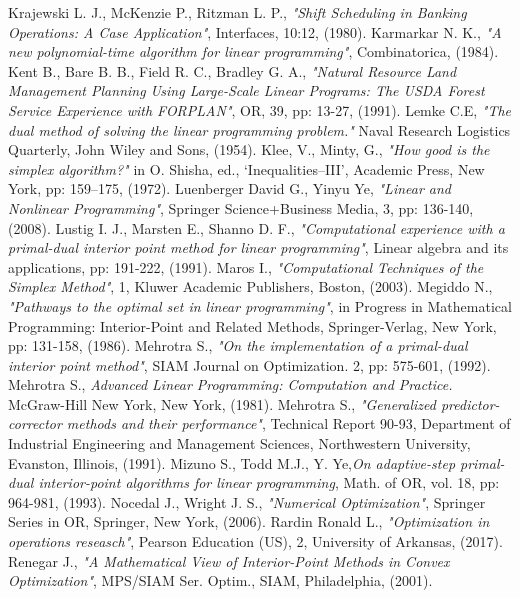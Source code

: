 \documentclass[a4paper,10 pt,titlepage,twoside]{book}
\theoremstyle{plain}
\theoremstyle{definition}
\theoremstyle{remark}
\begin{document}
{{\begin{thebibliography}{9}
		Krajewski L. J., McKenzie P., Ritzman L. P.,\textit{ "Shift Scheduling in Banking Operations: A Case Application"}, Interfaces, 10:12, (1980).
		 Karmarkar N. K.,\emph{ "A new polynomial-time algorithm for linear programming"}, Combinatorica, (1984).
		 Kent B., Bare B. B., Field R. C., Bradley G. A., \textit{"Natural Resource Land Management Planning Using Large-Scale Linear Programs: The USDA Forest Service Experience with FORPLAN"}, OR, 39, pp: 13-27, (1991).
		 Lemke C.E,\textit{ "The dual method of solving the linear programming problem."} Naval Research Logistics Quarterly, John Wiley and Sons, (1954).
		 Klee, V., Minty, G.,\emph{ "How good is the simplex algorithm?"} in O. Shisha, ed., ‘Inequalities–III’, Academic Press, New York, pp: 159–175, (1972).
		Luenberger David G., Yinyu Ye, \emph{"Linear and Nonlinear Programming"}, Springer Science+Business Media, 3, pp: 136-140, (2008).
		 Lustig I. J., Marsten E., Shanno D. F.,\emph{ "Computational experience with a primal-dual interior point method for linear programming"}, Linear algebra and its applications, pp: 191-222, (1991).
		 Maros I., \emph{"Computational Techniques of the Simplex Method"}, 1, Kluwer
		Academic Publishers, Boston, (2003).
		 Megiddo N., \emph{"Pathways to the optimal set in linear programming"}, in Progress in Mathematical Programming: Interior-Point and Related Methods, Springer-Verlag, New York, pp: 131-158, (1986).
	 Mehrotra S., \emph{ "On the implementation of a primal-dual interior point method"}, SIAM Journal on Optimization. 2, pp: 575-601, (1992).
	 Mehrotra S., \emph{ Advanced Linear Programming: Computation and
	Practice. } McGraw-Hill New York, New York, (1981).
 Mehrotra S., \emph{"Generalized predictor-corrector methods and their performance"}, Technical Report 90-93, Department of Industrial Engineering and Management Sciences, Northwestern University, Evanston, Illinois, (1991).
		Mizuno S., Todd M.J., Y. Ye,\emph{\;On adaptive-step primal-dual interior-point algorithms for linear programming}, Math. of OR, vol. 18, pp: 964-981, (1993). 
	Nocedal J., Wright J. S., \emph{\;"Numerical Optimization"}, Springer Series in OR, Springer, New York, (2006).
 Rardin Ronald L., \textit{"Optimization in operations reseasch"}, Pearson Education (US), 2, University of Arkansas, (2017).
Renegar J., \textit{ "A Mathematical View of Interior-Point Methods in Convex Optimization"}, MPS/SIAM
Ser. Optim., SIAM, Philadelphia, (2001).


\end{thebibliography}}}
\end{document}
